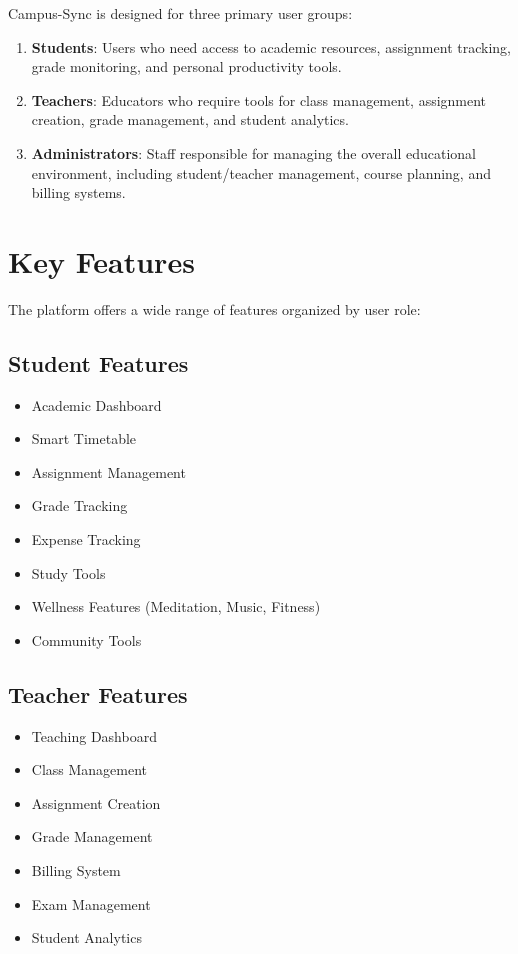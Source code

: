 Campus-Sync is designed for three primary user groups:

\begin{enumerate}[label=\textbf{\arabic*.}]
    \item \textbf{Students}: Users who need access to academic resources, assignment tracking, grade monitoring, and personal productivity tools.
    \item \textbf{Teachers}: Educators who require tools for class management, assignment creation, grade management, and student analytics.
    \item \textbf{Administrators}: Staff responsible for managing the overall educational environment, including student/teacher management, course planning, and billing systems.
\end{enumerate}

\section{Key Features}

The platform offers a wide range of features organized by user role:

\subsection{Student Features}
\begin{itemize}
    \item Academic Dashboard
    \item Smart Timetable
    \item Assignment Management
    \item Grade Tracking
    \item Expense Tracking
    \item Study Tools
    \item Wellness Features (Meditation, Music, Fitness)
    \item Community Tools
\end{itemize}

\subsection{Teacher Features}
\begin{itemize}
    \item Teaching Dashboard
    \item Class Management
    \item Assignment Creation
    \item Grade Management
    \item Billing System
    \item Exam Management
    \item Student Analytics
\end{itemize}

